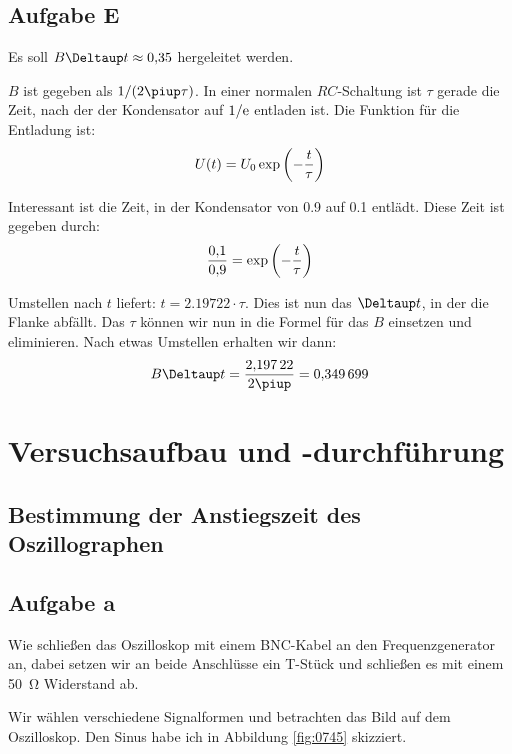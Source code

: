 \subsection{Aufgabe E}

Es soll $B \Deltaup t \approx \num{0.35}$ hergeleitet werden.

$B$ ist gegeben als $1/(2 \piup \tau)$. In einer normalen $RC$-Schaltung ist
$\tau$ gerade die Zeit, nach der der Kondensator auf $1/\mathrm e$ entladen ist. Die
Funktion für die Entladung ist:
\[
	U(t) = U_0 \exp\del{- \frac t\tau}
\]

Interessant ist die Zeit, in der Kondensator von \num{0.9} auf \num{0.1}
entlädt. Diese Zeit ist gegeben durch:
\[
	\frac{\num{0.1}}{\num{0.9}} = \exp\del{- \frac t\tau}
\]

Umstellen nach $t$ liefert: $t = \num{2.19722} \cdot \tau$. Dies ist nun das
$\Deltaup t$, in der die Flanke abfällt. Das $\tau$ können wir nun in die
Formel für das $B$ einsetzen und eliminieren. Nach etwas Umstellen erhalten wir
dann:
\[
	B \Deltaup t = \frac{\num{2.19722}}{2 \piup} = \num{0.349699}
\]


\section{Versuchsaufbau und -durchführung}

\subsection{Bestimmung der Anstiegszeit des Oszillographen}

\subsection{Aufgabe a}

Wie schließen das Oszilloskop mit einem BNC-Kabel an den Frequenzgenerator an,
dabei setzen wir an beide Anschlüsse ein T-Stück und schließen es mit einem
\SI{50}{\ohm} Widerstand ab.

Wir wählen verschiedene Signalformen und betrachten das Bild auf dem Oszilloskop. Den Sinus habe ich in Abbildung \ref{fig:0745} skizziert.

